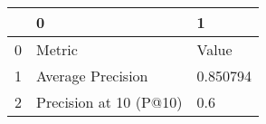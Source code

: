 \begin{tabular}{lll}
\toprule
{} &                       0 &         1 \\
\midrule
0 &                  Metric &     Value \\
1 &       Average Precision &  0.850794 \\
2 &  Precision at 10 (P@10) &       0.6 \\
\bottomrule
\end{tabular}
